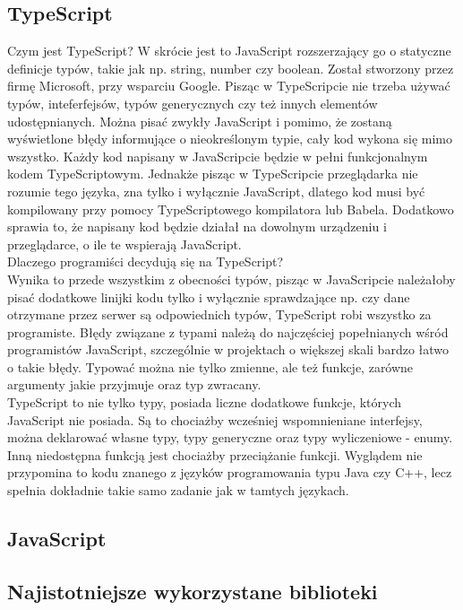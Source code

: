 \documentclass[12pt]{article}
\begin{document}
\begin{sloppypar}
{\subsection{TypeScript}
{
  Czym jest TypeScript? W skrócie jest to JavaScript rozszerzający go o statyczne definicje typów, takie jak np. string, number czy boolean. 
  Został stworzony przez firmę Microsoft, przy wsparciu Google.
  Pisząc w TypeScripcie nie trzeba używać typów, inteferfejsów, typów generycznych czy też innych elementów udostępnianych. 
  Można pisać zwykły JavaScript i pomimo, że zostaną wyświetlone błędy informujące o nieokreślonym typie, cały kod wykona się mimo wszystko.
  Każdy kod napisany w JavaScripcie będzie w pełni funkcjonalnym kodem TypeScriptowym.
  Jednakże pisząc w TypeScripcie przeglądarka nie rozumie tego języka, zna tylko i wyłącznie JavaScript, dlatego kod musi być kompilowany przy pomocy 
  TypeScriptowego kompilatora lub Babela. 
  Dodatkowo sprawia to, że napisany kod będzie działał na dowolnym urządzeniu i przeglądarce, o ile te wspierają JavaScript.\\
  Dlaczego programiści decydują się na TypeScript?\\
  Wynika to przede wszystkim z obecności typów, pisząc w JavaScripcie należałoby pisać dodatkowe linijki kodu tylko i wyłącznie sprawdzające np. czy 
  dane otrzymane przez serwer są odpowiednich typów, TypeScript robi wszystko za programiste. 
  Błędy związane z typami należą do najczęściej popełnianych wśród programistów JavaScript, szczególnie w projektach o większej skali bardzo łatwo o takie błędy.
  Typować można nie tylko zmienne, ale też funkcje, zarówne argumenty jakie przyjmuje oraz typ zwracany.\\
  TypeScript to nie tylko typy, posiada liczne dodatkowe funkcje, których JavaScript nie posiada. Są to chociażby wcześniej wspomnieniane interfejsy, 
  można deklarować własne typy, typy generyczne oraz typy wyliczeniowe - enumy. Inną niedostępna funkcją jest chociażby przeciążanie funkcji. 
  Wyglądem nie przypomina to kodu znanego z języków programowania typu Java czy C++, lecz spełnia dokładnie takie samo zadanie jak w tamtych językach.
}
\subsection{JavaScript}
{

}
\subsection{Najistotniejsze wykorzystane biblioteki}
{

}}
\end{sloppypar}
\end{document}
